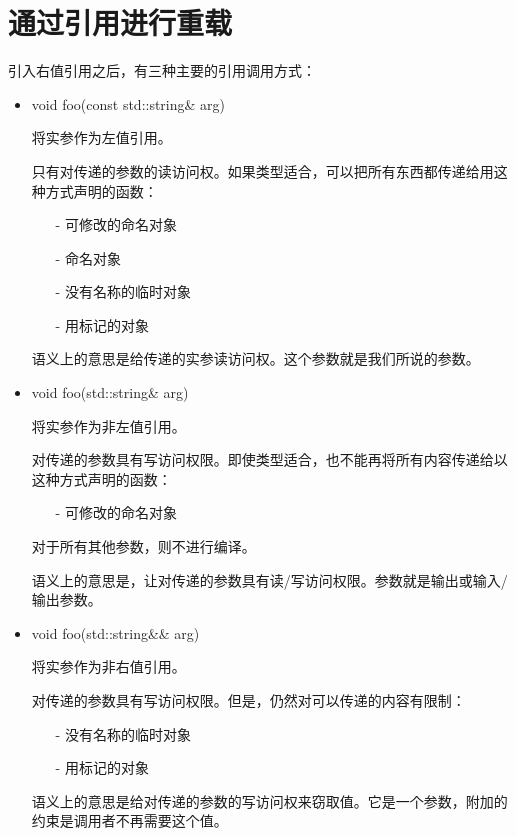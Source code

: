 \section{通过引用进行重载}
引入右值引用之后，有三种主要的引用调用方式：

\begin{itemize}
	\item \begin{cppcode}
void foo(const std::string\& arg)
\end{cppcode}
	将实参作为左值引用。

	只有对传递的参数的读访问权。如果类型适合，可以把所有东西都传递给用这种方式声明的函数：

	\begin{itemize}
		\item[-] 可修改的命名对象
		\item[-] 命名对象
		\item[-] 没有名称的临时对象
		\item[-] 用标记的对象
	\end{itemize}
	语义上的意思是给传递的实参读访问权。这个参数就是我们所说的参数。
	\item \begin{cppcode}
void foo(std::string\& arg)
\end{cppcode}
	将实参作为非左值引用。

	对传递的参数具有写访问权限。即使类型适合，也不能再将所有内容传递给以这种方式声明的函数：

	\begin{itemize}
		\item[-] 可修改的命名对象
	\end{itemize}
	对于所有其他参数，则不进行编译。

	语义上的意思是，让对传递的参数具有读/写访问权限。参数就是输出或输入/输出参数。

	\item \begin{cppcode}
void foo(std::string\&\& arg)
\end{cppcode}
	将实参作为非右值引用。

	对传递的参数具有写访问权限。但是，仍然对可以传递的内容有限制：

	\begin{itemize}
		\item[-] 没有名称的临时对象
		\item[-] 用标记的对象
	\end{itemize}
	语义上的意思是给对传递的参数的写访问权来窃取值。它是一个参数，附加的约束是调用者不再需要这个值。
\end{itemize}

